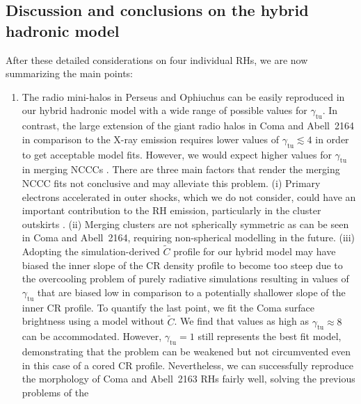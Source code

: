 \documentclass[traditabstract]{aa}
\newcommand{\rmn}{\mathrm}
\begin{document}

\subsection{Discussion and conclusions on the hybrid hadronic model}

After these detailed considerations on four individual RHs, we
are now summarizing the main points:
\begin{enumerate} 
\item The radio mini-halos in Perseus and Ophiuchus can be easily reproduced in
  our hybrid hadronic model with a wide range of possible values for
  $\gamma_{\rmn{tu}}$. In contrast, the large extension of the giant radio halos
  in Coma and Abell~2164 in comparison to the X-ray emission requires lower
  values of $\gamma_{\rmn{tu}}\lesssim4$ in order to get acceptable model
  fits. However, we would expect higher values for $\gamma_{\rmn{tu}}$ in
  merging NCCCs \citep{2011A&A...527A..99E}.  There are three main factors that
  render the merging NCCC fits not conclusive and may alleviate this problem.
  (i) Primary electrons accelerated in outer shocks, which we do not consider,
  could have an important contribution to the RH emission, particularly in the
  cluster outskirts \citep{2008MNRAS.385.1211P}.  (ii) Merging clusters are not
  spherically symmetric as can be seen in Coma and Abell~2164, requiring
  non-spherical modelling in the future. (iii) Adopting the simulation-derived
  $\tilde{C}$ profile \citep{2010MNRAS.409..449P} for our hybrid model may have
  biased the inner slope of the CR density profile to become too steep due to
  the overcooling problem of purely radiative simulations resulting in values of
  $\gamma_{\rmn{tu}}$ that are biased low in comparison to a potentially
  shallower slope of the inner CR profile. To quantify the last point, we fit
  the Coma surface brightness using a model without $\tilde{C}$. We find that
  values as high as $\gamma_{\rmn{tu}} \approx 8$ can be accommodated. However,
  $\gamma_{\rmn{tu}}=1$ still represents the best fit model, demonstrating that
  the problem can be weakened but not circumvented even in this case of a cored
  CR profile. Nevertheless, we can successfully reproduce the morphology of Coma
  and Abell~2163 RHs fairly well, solving the previous problems of the

\end{enumerate}
\end{document}
